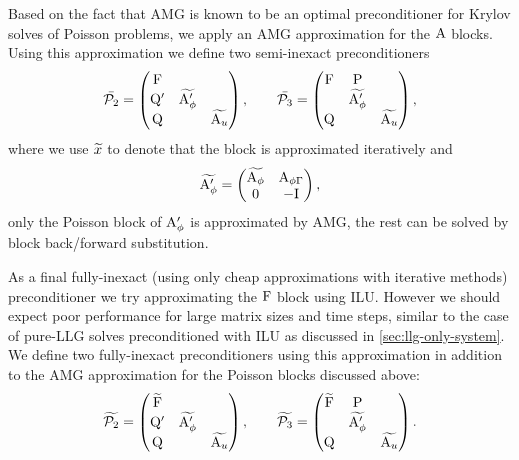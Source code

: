 Based on the fact that AMG is known to be an optimal preconditioner for Krylov solves of Poisson problems, we apply an AMG approximation for the $\mathrm{A}$ blocks.
Using this approximation we define two semi-inexact preconditioners
\begin{equation}
  \bar{\mathcal{P}_2} =
  \begin{pmatrix}
    \mathrm{F}       &           &  \\
    \mathrm{Q}'       & \widetilde{\mathrm{A}_\phi'} &   \\
    \mathrm{Q}       &           &   \widetilde{\mathrm{A}_u}
  \end{pmatrix},
  \qquad
  \bar{\mathcal{P}_3} =
  \begin{pmatrix}
    \mathrm{F}       & \mathrm{P}       &  \\
    & \widetilde{\mathrm{A}_\phi'} &   \\
    \mathrm{Q}       &           &  \widetilde{\mathrm{A}_u}
  \end{pmatrix},
  \label{eq:ms-block-prec-drop-p}
\end{equation}
where we use $\widetilde{x}$ to denote that the block is approximated iteratively and
\begin{equation}
  \widetilde{\mathrm{A}_\phi'} =
  \begin{pmatrix}
    \widetilde{\mathrm{A}_\phi}     & \mathrm{A}_{\phi{\Gamma}} \\
    0      & -\mathrm{I}
  \end{pmatrix},
\end{equation}
\ie only the Poisson block of $\mathrm{A}_\phi'$ is approximated by AMG, the rest can be solved by block back/forward substitution.

As a final fully-inexact (\ie using only cheap approximations with iterative methods) preconditioner we try approximating the $\mathrm{F}$ block using ILU.
However we should expect poor performance for large matrix sizes and time steps, similar to the case of pure-LLG solves preconditioned with ILU as discussed in \cref{sec:llg-only-system}.
We define two fully-inexact preconditioners using this approximation in addition to the AMG approximation for the Poisson blocks discussed above:
\begin{equation}
  \widetilde{\mathcal{P}_2} =
  \begin{pmatrix}
    \widetilde{\mathrm{F}} &           &  \\
    \mathrm{Q}'       & \widetilde{\mathrm{A}_\phi'} &   \\
    \mathrm{Q}       &           &   \widetilde{\mathrm{A}_u}
  \end{pmatrix},
  \qquad
  \widetilde{\mathcal{P}_3} =
  \begin{pmatrix}
   \widetilde{\mathrm{F}}       & \mathrm{P}       &  \\
    & \widetilde{\mathrm{A}_\phi'} &   \\
    \mathrm{Q}       &           &  \widetilde{\mathrm{A}_u}
  \end{pmatrix}.
  \label{eq:ms-block-prec-drop-p}
\end{equation}


